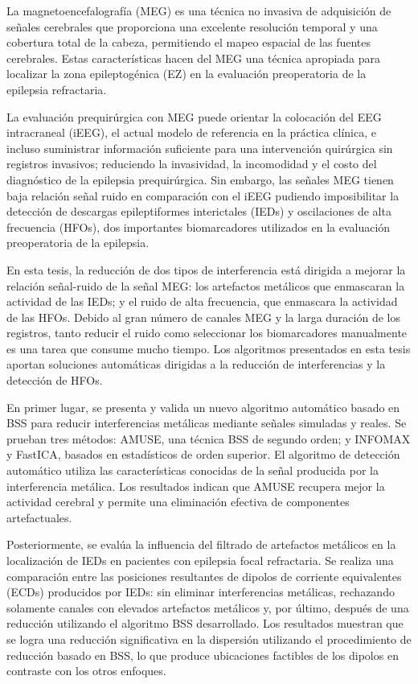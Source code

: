 \newpage

{}

\begin{resumen}

La magnetoencefalografía (MEG) es una técnica no invasiva de adquisición de señales cerebrales que proporciona una excelente resolución temporal y una cobertura total de la cabeza, permitiendo el mapeo espacial de las fuentes cerebrales. Estas características hacen del MEG una técnica apropiada para localizar la zona epileptogénica (EZ) en la evaluación preoperatoria de la epilepsia refractaria. 

La evaluación prequirúrgica con MEG puede orientar la colocación del EEG intracraneal (iEEG), el actual modelo de referencia en la práctica clínica, e incluso suministrar información suficiente para una intervención quirúrgica sin registros invasivos; reduciendo la invasividad, la incomodidad y el costo del diagnóstico de la epilepsia prequirúrgica. Sin embargo, las señales MEG tienen baja relación señal ruido en comparación con el iEEG pudiendo imposibilitar la detección de descargas epileptiformes interictales (IEDs) y oscilaciones de alta frecuencia (HFOs), dos importantes biomarcadores utilizados en la evaluación preoperatoria de la epilepsia.

En esta tesis, la reducción de dos tipos de interferencia está dirigida a mejorar la relación señal-ruido de la señal MEG: los artefactos metálicos que enmascaran la actividad de las IEDs; y el ruido de alta frecuencia, que enmascara la actividad de las HFOs. Debido al gran número de canales MEG y la larga duración de los registros, tanto reducir el ruido como seleccionar los biomarcadores manualmente es una tarea que consume mucho tiempo. Los algoritmos presentados en esta tesis aportan soluciones automáticas dirigidas a la reducción de interferencias y la detección de HFOs. 

En primer lugar, se presenta y valida un nuevo algoritmo automático basado en BSS para reducir interferencias metálicas mediante señales simuladas y reales. Se prueban tres métodos: AMUSE, una técnica BSS de segundo orden; y INFOMAX y FastICA, basados en estadísticos de orden superior. El algoritmo de detección automático utiliza las características conocidas de la señal producida por la interferencia metálica. Los resultados indican que AMUSE recupera mejor la actividad cerebral y permite una eliminación efectiva de componentes artefactuales.

Posteriormente, se evalúa la influencia del filtrado de artefactos metálicos en la localización de IEDs en pacientes con epilepsia focal refractaria. Se realiza una comparación entre las posiciones resultantes de dipolos de corriente equivalentes (ECDs) producidos por IEDs: sin eliminar interferencias metálicas, rechazando solamente canales con elevados artefactos metálicos y, por último, después de una reducción utilizando el algoritmo BSS desarrollado. Los resultados muestran que se logra una reducción significativa en la dispersión utilizando el procedimiento de reducción basado en BSS, lo que produce ubicaciones factibles de los dipolos en contraste con los otros enfoques.


\end{resumen}
